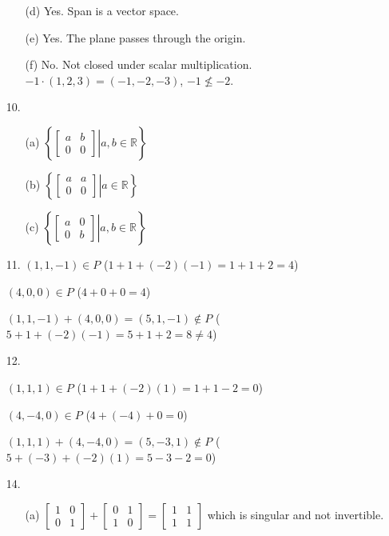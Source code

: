 \documentclass{article}
\begin{document}
\begin{enumerate}
\begin{itemize}
			\item[(d)] Yes. Span is a vector space.

			\item[(e)] Yes. The plane passes through the origin.

			\item[(f)] No. Not closed under scalar multiplication. $-1\cdot(1,2,3)=(-1,-2,-3)$, $-1\not\leq-2$.

		\end{itemize}

	
	\item[10.]
		\begin{itemize}
			\item[(a)]
				$\left\{\left.\begin{bmatrix}
							a & b \\ 0 & 0
				\end{bmatrix}\right|a,b\in\mathbb R\right\}$

			\item[(b)]
				$\left\{\left.\begin{bmatrix}
							a & a \\ 0 & 0
				\end{bmatrix}\right|a\in\mathbb R\right\}$
				
			\item[(c)]
				$\left\{\left.\begin{bmatrix}
							a & 0 \\ 0 & b
				\end{bmatrix}\right|a,b\in\mathbb R\right\}$
		\end{itemize}
	
	\item[11.]
		$(1,1,-1)\in P$ ($1+1+(-2)(-1)=1+1+2=4$)

		$(4,0,0)\in P$ ($4+0+0=4$)

		$(1,1,-1)+(4,0,0)=(5,1,-1)\not\in P$ ($5+1+(-2)(-1)=5+1+2=8\neq4$)

	\item[12.]

		$(1,1,1)\in P$ ($1+1+(-2)(1)=1+1-2=0$)

		$(4,-4,0)\in P$ ($4+(-4)+0=0$)

		$(1,1,1)+(4,-4,0)=(5,-3,1)\not\in P$ ($5+(-3)+(-2)(1)=5-3-2=0$)
	
	\item[14.]
		\begin{itemize}
		    \item[(a)]
				$\begin{bmatrix}
					1 & 0 \\ 
					0 & 1
				\end{bmatrix}+\begin{bmatrix}
					0 & 1 \\
					1 & 0
				\end{bmatrix}=\begin{bmatrix}
					1 & 1 \\ 
					1 & 1
				\end{bmatrix}$ 
				which is singular and not invertible.


\end{itemize}
\end{enumerate}
\end{document}
